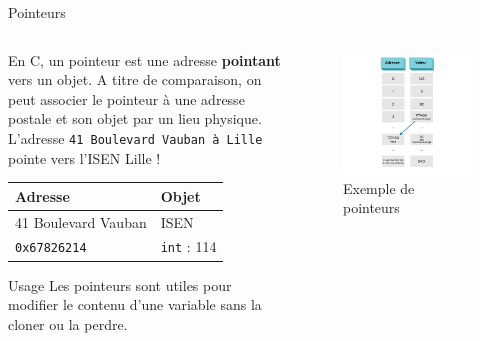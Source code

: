 \documentclass[
  10pt,
  french,
  ignorenonframetext,
  aspectratio=169,
]{beamer}
\begin{document}
\begin{frame}[fragile]{Pointeurs}
\protect\hypertarget{pointeurs}{}
\begin{columns}[T]
\begin{column}{0.48\textwidth}
En C, un pointeur est une adresse \textbf{pointant} vers un objet. A
titre de comparaison, on peut associer le pointeur à une adresse postale
et son objet par un lieu physique. L'adresse
\texttt{41\ Boulevard\ Vauban\ à\ Lille} pointe vers l'ISEN Lille !

\begin{longtable}[]{@{}ll@{}}
\toprule
Adresse & Objet \\
\midrule
\endhead
41 Boulevard Vauban & ISEN \\
\texttt{0x67826214} & \texttt{int} : 114 \\
\bottomrule
\end{longtable}

\begin{block}{Usage}
\protect\hypertarget{usage}{}
Les pointeurs sont utiles pour modifier le contenu d'une variable sans
la cloner ou la perdre.
\end{block}
\end{column}

\begin{column}{0.48\textwidth}
\begin{figure}
\centering
\includegraphics[width=\textwidth,height=0.8\textheight]{img/pointeurs.png}
\caption{Exemple de pointeurs}
\end{figure}
\end{column}
\end{columns}
\end{frame}
\end{document}
